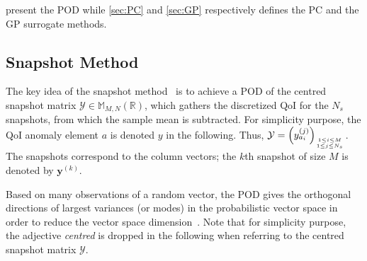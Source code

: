  present the POD while \cref{sec:PC} and \cref{sec:GP} respectively defines the PC and the GP surrogate methods.


\subsection{Snapshot Method}\label{sec:POD}

The key idea of the snapshot method~\citep{sirovich1987} is to achieve a POD of the centred snapshot matrix $\mathcal{Y} \in \mathbb{M}_{M,N}(\mathbb{R})$, which gathers the discretized QoI for the $N_{s}$ snapshots, from which the sample mean is subtracted. For simplicity purpose, the QoI anomaly element $a$ is denoted $y$ in the following. Thus, $\mathcal{Y} = \left(y_{a_i}^{(j)}\right)_{1\leq i \leq M \atop 1\leq j \leq N_{s}}$. The snapshots correspond to the column vectors; the $k$th snapshot of size $M$ is denoted by $\mathbf{y}^{(k)}$.

Based on many observations of a random vector, the POD gives the orthogonal directions of largest variances (or modes) in the probabilistic vector space in order to reduce the vector space dimension~\citep{chatterjee2000}. Note that for simplicity purpose, the adjective {\it centred} is dropped in the following when referring to the centred snapshot matrix $\mathcal{Y}$.

